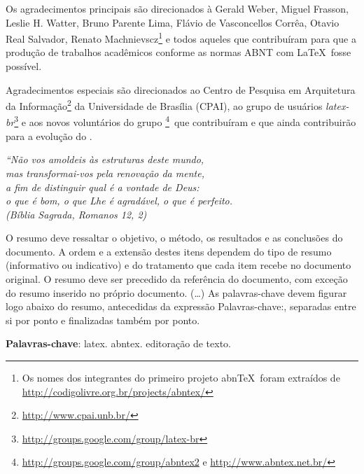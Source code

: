 \documentclass[
  12pt,
  oneside,
  a4paper,
  chapter=TITLE,
  section=TITLE,
  subsubsection=TITLE,
  brazil]{abntex2}
\begin{document}
\begin{agradecimentos}
Os agradecimentos principais são direcionados à Gerald Weber, Miguel Frasson,
Leslie H. Watter, Bruno Parente Lima, Flávio de Vasconcellos Corrêa, Otavio Real
Salvador, Renato Machnievscz\footnote{Os nomes dos integrantes do primeiro
projeto abn\TeX\ foram extraídos de
\url{http://codigolivre.org.br/projects/abntex/}} e todos aqueles que
contribuíram para que a produção de trabalhos acadêmicos conforme
as normas ABNT com \LaTeX\ fosse possível.

Agradecimentos especiais são direcionados ao Centro de Pesquisa em Arquitetura
da Informação\footnote{\url{http://www.cpai.unb.br/}} da Universidade de
Brasília (CPAI), ao grupo de usuários
\emph{latex-br}\footnote{\url{http://groups.google.com/group/latex-br}} e aos
novos voluntários do grupo
\emph{\abnTeX}\footnote{\url{http://groups.google.com/group/abntex2} e
\url{http://www.abntex.net.br/}}~que contribuíram e que ainda
contribuirão para a evolução do \abnTeX.

\end{agradecimentos}

\begin{epigrafe}
    \vspace*{\fill}
	\begin{flushright}
		\textit{``Não vos amoldeis às estruturas deste mundo, \\
		mas transformai-vos pela renovação da mente, \\
		a fim de distinguir qual é a vontade de Deus: \\
		o que é bom, o que Lhe é agradável, o que é perfeito.\\
		(Bíblia Sagrada, Romanos 12, 2)}
	\end{flushright}
\end{epigrafe}


\setlength{\absparsep}{18pt}
\begin{resumo}
 O resumo deve ressaltar o
 objetivo, o método, os resultados e as conclusões do documento. A ordem e a extensão
 destes itens dependem do tipo de resumo (informativo ou indicativo) e do
 tratamento que cada item recebe no documento original. O resumo deve ser
 precedido da referência do documento, com exceção do resumo inserido no
 próprio documento. (\ldots) As palavras-chave devem figurar logo abaixo do
 resumo, antecedidas da expressão Palavras-chave:, separadas entre si por
 ponto e finalizadas também por ponto.

 \textbf{Palavras-chave}: latex. abntex. editoração de texto.
\end{resumo}
\end{document}
